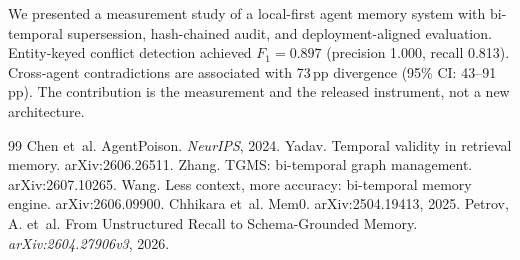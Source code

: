 \documentclass{llncs}
\begin{document}
We presented a measurement study of a local-first agent memory system with bi-temporal supersession, hash-chained audit, and deployment-aligned evaluation. Entity-keyed conflict detection achieved $F_1{=}0.897$ (precision 1.000, recall 0.813). Cross-agent contradictions are associated with 73\,pp divergence (95\% CI: 43--91\,pp). The contribution is the measurement and the released instrument, not a new architecture.
\enlargethispage{10\baselineskip}
\scriptsize
\begin{thebibliography}{99}
Chen et~al. AgentPoison. \emph{NeurIPS}, 2024.
Yadav. Temporal validity in retrieval memory. arXiv:2606.26511.
Zhang. TGMS: bi-temporal graph management. arXiv:2607.10265.
Wang. Less context, more accuracy: bi-temporal memory engine. arXiv:2606.09900.
Chhikara et~al. Mem0. arXiv:2504.19413, 2025.
Petrov, A. et~al.
From Unstructured Recall to Schema-Grounded Memory.
\emph{arXiv:2604.27906v3}, 2026.
\end{thebibliography}
\end{document}
